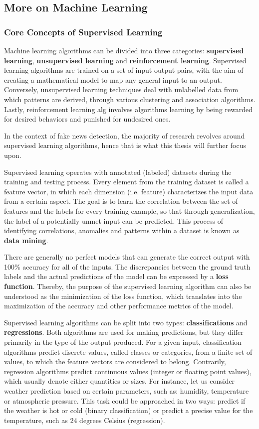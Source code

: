 \subsection{More on Machine Learning}
\subsubsection{Core Concepts of Supervised Learning}
Machine learning algorithms can be divided into three categories: \textbf{supervised learning}, \textbf{unsupervised learning} and \textbf{reinforcement learning}. Supervised learning algorithms are trained on a set of input-output pairs, with the aim of creating a mathematical model to map any general input to an output. Conversely, unsupervised learning techniques deal with unlabelled data from which patterns are derived, through various clustering and association algorithms. Lastly, reinforcement learning alg involves algorithms learning by being rewarded for desired behaviors and punished for undesired ones. 

In the context of fake news detection, the majority of research revolves around supervised learning algorithms, hence that is what this thesis will further focus upon.

Supervised learning operates with annotated (labeled) datasets during the training and testing process. Every element from the training dataset is called a feature vector, in which each dimension (i.e. feature) characterizes the input data from a certain aspect. The goal is to learn the correlation between the set of features and the labels for every training example, so that through generalization, the label of a potentially unmet input can be predicted. This process of identifying correlations, anomalies and patterns within a dataset is known as \textbf{data mining}. 

There are generally no perfect models that can generate the correct output with 100\% accuracy for all of the inputs. The discrepancies between the ground truth labels and the actual predictions of the model can be expressed by a \textbf{loss function}. Thereby, the purpose of the supervised learning algorithm can also be understood as the minimization of the loss function, which translates into the maximization of the accuracy and other performance metrics of the model.

Supervised learning algorithms can be split into two types: \textbf{classifications} and \textbf{regressions}. Both algorithms are used for making predictions, but they differ primarily in the type of the output produced. For a given input, classification algorithms predict discrete values, called classes or categories, from a finite set of values, to which the feature vectors are considered to belong. Contrarily, regression algorithms predict continuous values (integer or floating point values), which usually denote either quantities or sizes. For instance, let us consider weather prediction based on certain parameters, such as: humidity, temperature or atmospheric pressure. This task could be approached in two ways: predict if the weather is hot or cold (binary classification) or predict a precise value for the temperature, such as 24 degrees Celsius (regression).

